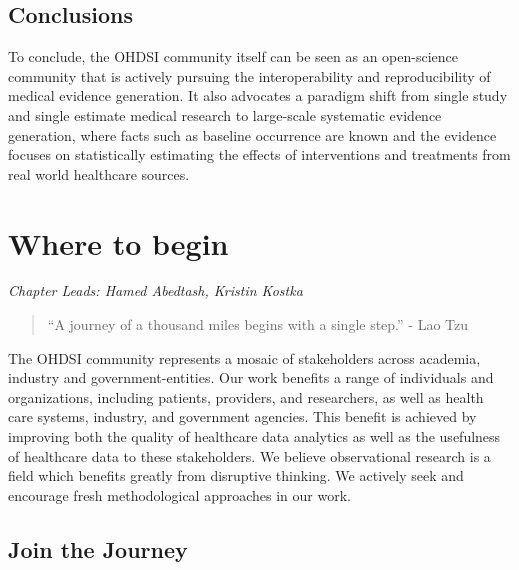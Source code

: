\documentclass[11pt]{book}
\theoremstyle{definition}
\theoremstyle{definition}
\theoremstyle{definition}
\theoremstyle{remark}
\begin{document}
\hypertarget{conclusions}{%
\section{Conclusions}\label{conclusions}}

To conclude, the OHDSI community itself can be seen as an open-science community that is actively pursuing the interoperability and reproducibility of medical evidence generation. It also advocates a paradigm shift from single study and single estimate medical research to large-scale systematic evidence generation, where facts such as baseline occurrence are known and the evidence focuses on statistically estimating the effects of interventions and treatments from real world healthcare sources.

\hypertarget{WhereToBegin}{%
\chapter{Where to begin}\label{WhereToBegin}}

\emph{Chapter Leads: Hamed Abedtash, Kristin Kostka}

\begin{quote}
``A journey of a thousand miles begins with a single step.'' - Lao Tzu
\end{quote}

The OHDSI community represents a mosaic of stakeholders across academia, industry and government-entities. Our work benefits a range of individuals and organizations, including patients, providers, and researchers, as well as health care systems, industry, and government agencies. This benefit is achieved by improving both the quality of healthcare data analytics as well as the usefulness of healthcare data to these stakeholders. We believe observational research is a field which benefits greatly from disruptive thinking. We actively seek and encourage fresh methodological approaches in our work. 

\hypertarget{join-the-journey}{%
\section{Join the Journey}\label{join-the-journey}}
\end{document}
